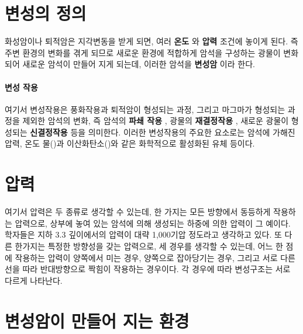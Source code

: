 \documentclass[12pt, a4paper, twoside]{book}
\begin{document}
	\clearpage
	\section{변성의 정의 }

				화성암이나 퇴적암은 지각변동을 받게 되면, 여러 \textbf{ 온도 }와 \textbf{ 압력 }조건에 놓이게 된다. 
				즉 주변 환경의 변화를 겪게 되므로 새로운 환경에 적합하게 암석을 구성하는 광물이 변화되어 새로운 암석이 만들어 지게 되는데, 이러한 암석을 \textbf{ 변성암 }이라 한다. 

				\paragraph{변성 작용}

				여기서 변성작용은 풍화작용과 퇴적암이 형성되는 과정, 그리고 마그마가 형성되는 과정을 제외한 암석의 변화, 즉 암석의 \textbf{ 파쇄 작용 }, 광물의 \textbf{ 재결정작용 }, 새로운 광물이 형성되는 \textbf{ 신결정작용 } 등을 의미한다.
 				이러한 변성작용의 주요한 요소로는 암석에 가해진 압력, 온도 물()과 이산화탄소()와 같은 화학적으로 활성화된 유체 등이다.

	\clearpage
	\section{압력}
	
	
				여기서 압력은 두 종류로 생각할 수 있는데, 한 가지는 모든 방향에서 동등하게 작용하는 압력으로, 상부에 놓여 있는 암석에 의해 생성되는 하중에 의한 압력이 그 예이다. 
				학자들은 지하 3.3  깊이에서의 압력이 대략 1,000기압 정도라고 생각하고 있다. 
				또 다른 한가지는 특정한 방향성을 갖는 압력으로, 세 경우를 생각할 수 있는데, 어느 한 점에 작용하는 압력이 양쪽에서 미는 경우, 양쪽으로 잡아당기는 경우, 그리고 서로 다른 선을 따라 반대방향으로 짝힘이 작용하는 경우이다. 
				각 경우에 따라 변성구조는 서로 다르게 나타난다.






	\clearpage
	\section{변성암이 만들어 지는 환경}
	
\end{document}
